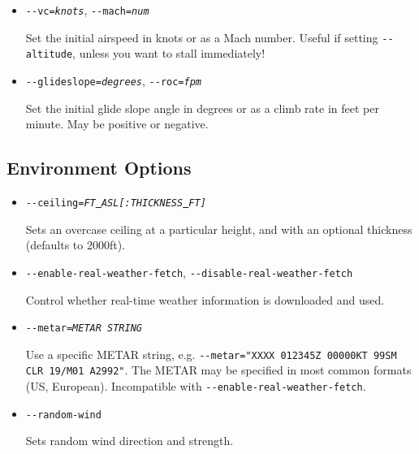 {\begin{itemize}
Set the initial speed along the South-North, West-East and vertical axes. Speed is in feet per second unless you
also select \texttt{-$ $-units-meters}, in which case altitude is in meters per second.

\item{\texttt{-$ $-vc={\it knots}}, \texttt{-$ $-mach={\it num}}}

Set the initial airspeed in knots or as a Mach number. Useful if setting \texttt{-$ $-altitude}, unless you want to stall immediately!

\item{\texttt{-$ $-glideslope={\it degrees}}, \texttt{-$ $-roc={\it fpm}}}

Set the initial glide slope angle in degrees or as a climb rate in feet per minute. May be positive or negative.

\end{itemize}

\subsection{Environment Options}
\begin{itemize}
\item{\texttt{-$ $-ceiling={\it FT\underline{~}ASL[:THICKNESS\underline{~}FT]}}}

Sets an overcase ceiling at a particular height, and with an optional thickness (defaults to 2000ft).

\item{\texttt{-$ $-enable-real-weather-fetch}, \texttt{-$ $-disable-real-weather-fetch}}

Control whether real-time weather information is downloaded and used.

\item{\texttt{-$ $-metar={\it METAR STRING}}}

Use a specific METAR string, e.g. \texttt{-$ $-metar="XXXX 012345Z 00000KT 99SM CLR 19/M01 A2992"}. The METAR may
be specified in most common formats (US, European). Incompatible with \texttt{-$ $-enable-real-weather-fetch}.

\item{\texttt{-$ $-random-wind}}

Sets random wind direction and strength.


\end{itemize}}

